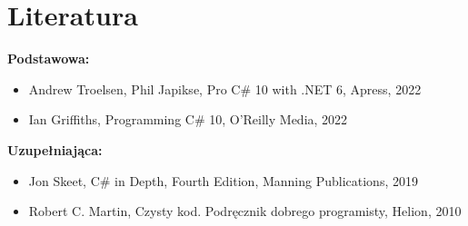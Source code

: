 \documentclass[12pt, a4paper]{article}
\begin{document}
\section{Literatura}

\textbf{Podstawowa:}
\begin{itemize}
  \item Andrew Troelsen, Phil Japikse, Pro C\# 10 with .NET 6, Apress, 2022
  \item Ian Griffiths, Programming C\# 10, O'Reilly Media, 2022
\end{itemize}

\textbf{Uzupełniająca:}
\begin{itemize}
  \item Jon Skeet, C\# in Depth, Fourth Edition, Manning Publications, 2019
  \item Robert C. Martin, Czysty kod. Podręcznik dobrego programisty, Helion, 2010
\end{itemize}
\end{document}
